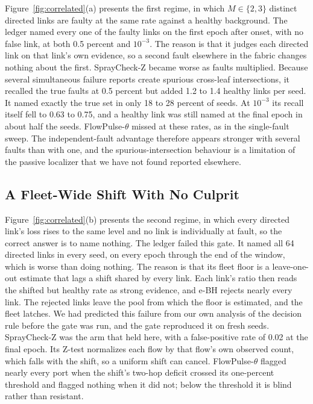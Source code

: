 Figure~\ref{fig:correlated}(a) presents the first regime, in which $M\in\{2,3\}$ distinct directed links are faulty at the same rate against a healthy background. The ledger named every one of the faulty links on the first epoch after onset, with no false link, at both 0.5 percent and $10^{-3}$. The reason is that it judges each directed link on that link's own evidence, so a second fault elsewhere in the fabric changes nothing about the first. SprayCheck-Z became worse as faults multiplied. Because several simultaneous failure reports create spurious cross-leaf intersections, it recalled the true faults at 0.5 percent but added 1.2 to 1.4 healthy links per seed. It named exactly the true set in only 18 to 28 percent of seeds. At $10^{-3}$ its recall itself fell to 0.63 to 0.75, and a healthy link was still named at the final epoch in about half the seeds. FlowPulse-$\theta$ missed at these rates, as in the single-fault sweep. The independent-fault advantage therefore appears stronger with several faults than with one, and the spurious-intersection behaviour is a limitation of the passive localizer that we have not found reported elsewhere.

\subsection{A Fleet-Wide Shift With No Culprit}

Figure~\ref{fig:correlated}(b) presents the second regime, in which every directed link's loss rises to the same level and no link is individually at fault, so the correct answer is to name nothing. The ledger failed this gate. It named all 64 directed links in every seed, on every epoch through the end of the window, which is worse than doing nothing. The reason is that its fleet floor is a leave-one-out estimate that lags a shift shared by every link. Each link's ratio then reads the shifted but healthy rate as strong evidence, and e-BH rejects nearly every link. The rejected links leave the pool from which the floor is estimated, and the fleet latches. We had predicted this failure from our own analysis of the decision rule before the gate was run, and the gate reproduced it on fresh seeds. SprayCheck-Z was the arm that held here, with a false-positive rate of 0.02 at the final epoch. Its Z-test normalizes each flow by that flow's own observed count, which falls with the shift, so a uniform shift can cancel. FlowPulse-$\theta$ flagged nearly every port when the shift's two-hop deficit crossed its one-percent threshold and flagged nothing when it did not; below the threshold it is blind rather than resistant.

